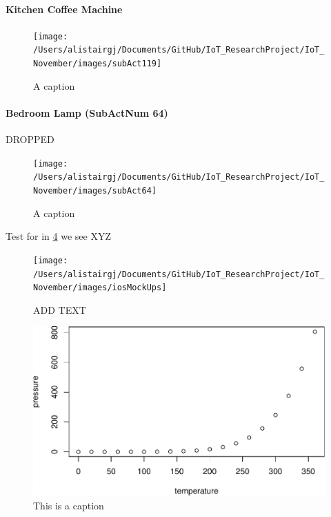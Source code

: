 \documentclass[11pt,]{article}
\newenvironment{Shaded}{\begin{snugshade}}{\end{snugshade}}
\newcommand{\NormalTok}[1]{\textcolor[rgb]{0.12,0.11,0.11}{#1}}
\newcommand{\OperatorTok}[1]{\textcolor[rgb]{0.12,0.11,0.11}{#1}}
\let\oldparagraph\paragraph
\renewcommand{\paragraph}[1]{\oldparagraph{#1}\mbox{}}
\begin{document}
\hypertarget{kitchen-coffee-machine}{%
\paragraph{Kitchen Coffee Machine}\label{kitchen-coffee-machine}}

\begin{figure}[H]
\texttt{[image: /Users/alistairgj/Documents/GitHub/IoT\_ResearchProject/IoT\_November/images/subAct119]} \caption{A caption}\label{fig:subAct119}
\end{figure}

\hypertarget{bedroom-lamp-subactnum-64}{%
\paragraph{Bedroom Lamp (SubActNum
64)}\label{bedroom-lamp-subactnum-64}}

DROPPED

\begin{figure}[H]
\texttt{[image: /Users/alistairgj/Documents/GitHub/IoT\_ResearchProject/IoT\_November/images/subAct64]} \caption{A caption}\label{fig:subAct64}
\end{figure}

\begin{Shaded}
\begin{Highlighting}[]
\OperatorTok{%
\end{Highlighting}
\end{Shaded}

Test for in \ref{fig:fig1} we see XYZ

\begin{figure}[H]

{\centering \texttt{[image: /Users/alistairgj/Documents/GitHub/IoT\_ResearchProject/IoT\_November/images/iosMockUps]} 

}

\caption{ADD TEXT}\label{fig:unnamed-chunk-22}
\end{figure}

\begin{figure}
\centering
\includegraphics{MD_Final_files/figure-latex/fig1-1.pdf}
\caption{\label{fig:fig1}This is a caption}
\end{figure}
\end{document}
